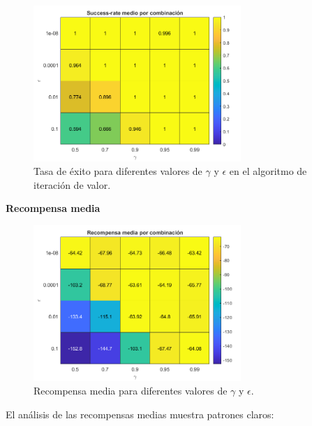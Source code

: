 \begin{figure}[H]
    \centering
    \includegraphics[width=0.7\textwidth]{../../experiments/valueIteration/experiment-1/results/success.png}
    \caption{Tasa de éxito para diferentes valores de $\gamma$ y $\epsilon$ en el algoritmo de iteración de valor.}
    \label{fig:successRateValueIteration}
\end{figure}

\textbf{Recompensa media}

\begin{figure}[H]
    \centering
    \includegraphics[width=0.7\textwidth]{../../experiments/valueIteration/experiment-1/results/reward.png}
    \caption{Recompensa media para diferentes valores de $\gamma$ y $\epsilon$.}
    \label{fig:rewardValueIteration}
\end{figure}

El análisis de las recompensas medias muestra patrones claros:

